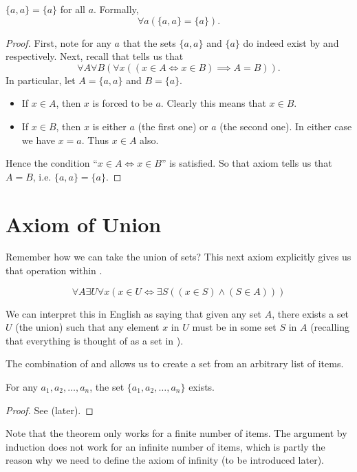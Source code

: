 \begin{theorem}
    $\{a, a\} = \{a\}$ for all $a$. Formally,
    \[
        \forall a (\{a,a\} = \{a\}).
    \]
\end{theorem}
\begin{proof}
    First, note for any $a$ that the sets $\{a, a\}$ and $\{a\}$ do indeed exist by  and  respectively. Next, recall that  tells us that
    \[
        \forall A \forall B \left(\forall x \left((x \in A \iff x \in B) \implies A = B\right)\right).
    \]
    In particular, let $A = \{a, a\}$ and $B = \{a\}$.
    \begin{itemize}
        \item If $x \in A$, then $x$ is forced to be $a$. Clearly this means that $x \in B$.
        \item If $x \in B$, then $x$ is either $a$ (the first one) or $a$ (the second one). In either case we have $x = a$. Thus $x \in A$ also.
    \end{itemize}
    Hence the condition ``$x \in A \iff x \in B$'' is satisfied. So that axiom tells us that $A = B$, i.e. $\{a, a\} = \{a\}$.
\end{proof}

\section{Axiom of Union}
Remember how we can take the union of sets? This next axiom explicitly gives us that operation within \ZFC.

\begin{axiom}[Union]\label{axiom:union}
    \[
        \forall A \exists U \forall x (x \in U \iff \exists S ((x \in S) \land (S \in A)))
    \]
\end{axiom}

We can interpret this in English as saying that given any set $A$, there exists a set $U$ (the union) such that any element $x$ in $U$ must be in some set $S$ in $A$ (recalling that everything is thought of as a set in \ZFC).

The combination of  and  allows us to create a set from an arbitrary list of items.

\begin{theorem}\label{theorem:set-of-any-list-of-items}
    For any $a_1, a_2, \dots, a_n$, the set $\{a_1, a_2, \dots, a_n\}$ exists.
\end{theorem}
\begin{proof}
    See  (later).
\end{proof}
\begin{remark}
    Note that the theorem only works for a finite number of items. The argument by induction does not work for an infinite number of items, which is partly the reason why we need to define the axiom of infinity (to be introduced later).
\end{remark}

